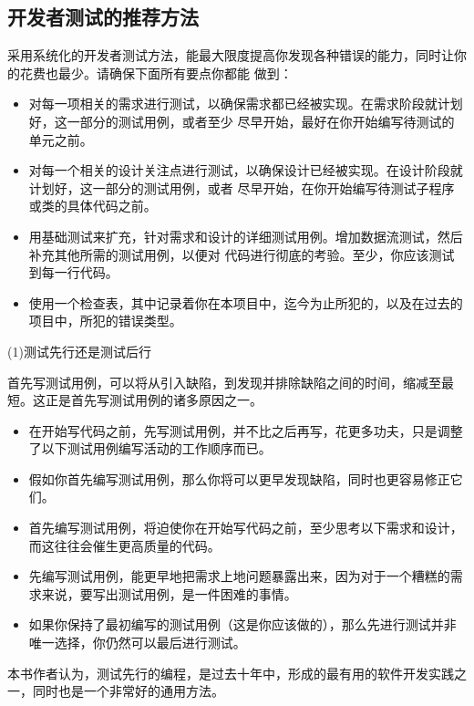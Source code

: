 \documentclass{article}
\begin{document}
\subsection{开发者测试的推荐方法}
采用系统化的开发者测试方法，能最大限度提高你发现各种错误的能力，同时让你的花费也最少。请确保下面所有要点你都能
做到：
\begin{itemize}
    \item 对每一项相关的需求进行测试，以确保需求都已经被实现。在需求阶段就计划好，这一部分的测试用例，或者至少
    尽早开始，最好在你开始编写待测试的单元之前。
    \item 对每一个相关的设计关注点进行测试，以确保设计已经被实现。在设计阶段就计划好，这一部分的测试用例，或者
    尽早开始，在你开始编写待测试子程序或类的具体代码之前。
    \item 用基础测试来扩充，针对需求和设计的详细测试用例。增加数据流测试，然后补充其他所需的测试用例，以便对
    代码进行彻底的考验。至少，你应该测试到每一行代码。
    \item 使用一个检查表，其中记录着你在本项目中，迄今为止所犯的，以及在过去的项目中，所犯的错误类型。
\end{itemize}

\par
(1)测试先行还是测试后行
\par
首先写测试用例，可以将从引入缺陷，到发现并排除缺陷之间的时间，缩减至最短。这正是首先写测试用例的诸多原因之一。
\begin{itemize}
    \item 在开始写代码之前，先写测试用例，并不比之后再写，花更多功夫，只是调整了以下测试用例编写活动的工作顺序而已。
    \item 假如你首先编写测试用例，那么你将可以更早发现缺陷，同时也更容易修正它们。
    \item 首先编写测试用例，将迫使你在开始写代码之前，至少思考以下需求和设计，而这往往会催生更高质量的代码。
    \item 先编写测试用例，能更早地把需求上地问题暴露出来，因为对于一个糟糕的需求来说，要写出测试用例，是一件困难的事情。
    \item 如果你保持了最初编写的测试用例（这是你应该做的），那么先进行测试并非唯一选择，你仍然可以最后进行测试。
\end{itemize}
本书作者认为，测试先行的编程，是过去十年中，形成的最有用的软件开发实践之一，同时也是一个非常好的通用方法。
\end{document}
